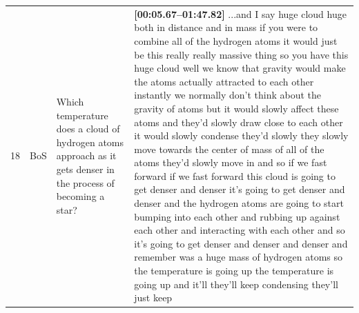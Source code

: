 \documentclass[10pt]{article}
\begin{document}
\begin{tiny}
\begin{longtable}{|r|p{0.375in}|p{1.275in}|p{3.5in}|}
18 &          BoS &                                                                                                                                                                   Which temperature does a cloud of hydrogen atoms approach as it gets denser in the process of becoming a star? &                                                                                                                                                                                                                                                                                                                                                                                                                                                                                                                                                                                                                                                                                                                                                                                                                                                                                                                                                                                                                                                                                                                                                                                                                                                                                                                                                                                                                                                                                                                                                                                                                                                                                                                                                                                                                                                                                                                                                                                                            \textbf{[00:05.67--01:47.82]} ...and I say huge cloud huge both in distance and in mass if you were to combine all of the hydrogen atoms it would just be this really really massive thing so you have this huge cloud well we know that gravity would make the atoms actually attracted to each other instantly we normally don't think about the gravity of atoms but it would slowly affect these atoms and they'd slowly draw close to each other it would slowly condense they'd slowly they slowly move towards the center of mass of all of the atoms they'd slowly move in and so if we fast forward if we fast forward this cloud is going to get denser and denser it's going to get denser and denser and the hydrogen atoms are going to start bumping into each other and rubbing up against each other and interacting with each other and so it's going to get denser and denser and denser and remember was a huge mass of hydrogen atoms so the temperature is going up the temperature is going up and it'll they'll keep condensing they'll just keep 
\end{longtable}
\end{tiny}
\end{document}
